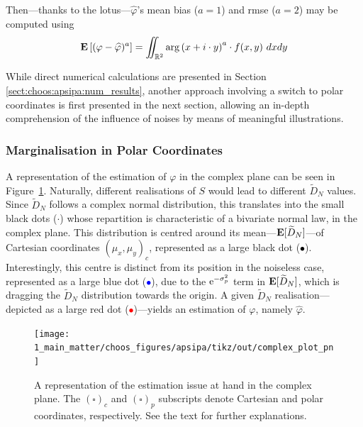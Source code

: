 Then---thanks to the \gls{lotus}---$\widehat{\varphi}$'s mean bias ($a=1$) and \gls{rmse} ($a=2$) may be computed using
\begin{equation}\label{eq:choos:apsipa:bias_rmse_cartesian}
	\esp\left[(\varphi - \widehat{\varphi})^{a} \right] = \iint_{\mathbb{R}^2} \arg\left(x + i \cdot y\right)^{a}\cdot f(x,y)\ dxdy
\end{equation}

While direct numerical calculations are presented in Section \ref{sect:choos:apsipa:num_results}, another approach involving a switch to polar coordinates is first presented in the next section, allowing an in-depth comprehension of the influence of noises by means of meaningful illustrations.

\subsubsection{Marginalisation in Polar Coordinates}

A representation of the estimation of $\varphi$ in the complex plane can be seen in Figure~\ref{fig:choos:apsipa:complex_plane_expl}. Naturally, different realisations of $S$ would lead to different $\widetilde{D}_N$ values. Since $\widetilde{D}_N$ follows a complex normal distribution, this translates into the small black dots ($\cdot$) whose repartition is characteristic of a bivariate normal law, in the complex plane. This distribution is centred around its mean---$\mathbf{E}[\widetilde{D}_N]$---of Cartesian coordinates $(\mu_x, \mu_y)_c$, represented as a large black dot (\textcolor{black}{$\bullet$}). Interestingly, this centre is distinct from its position in the noiseless case, represented as a large blue dot (\textcolor{blue}{$\bullet$}), due to the $\mathrm{e}^{-\sigma_p^2}$ term in $\mathbf{E}[\widetilde{D}_N]$, which is dragging the $\widetilde{D}_N$ distribution towards the origin. A given $\widetilde{D}_N$ realisation---depicted as a large red dot (\textcolor{red}{$\bullet$})---yields an estimation of $\varphi$, namely $\widehat{\varphi}$.

\begin{figure}
	\centering
	\texttt{[image: 1\_main\_matter/choos\_figures/apsipa/tikz/out/complex\_plot\_pn]}
	\caption[A representation of the estimation issue at hand in the complex plane.]{A representation of the estimation issue at hand in the complex plane. The $\left(\square\right)_c$ and $\left(\square\right)_p$ subscripts denote Cartesian and polar coordinates, respectively. See the text for further explanations.}
	\label{fig:choos:apsipa:complex_plane_expl}
\end{figure}

